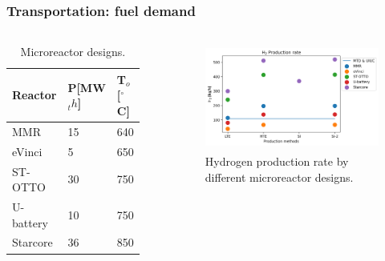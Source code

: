\begin{frame}
\frametitle{Transportation: fuel demand}
\begin{columns}
    \column[t]{4.5cm}
	\begin{table}[!htb]
		\centering
	    \caption{Microreactor designs.}
		\begin{tabular}{l|ll}
		\hline
		Reactor      & P[MW$_th$] & T$_o$[$^\circ$C]\\ \hline
		MMR          & 15         & 640             \\
		eVinci       & 5          & 650             \\
		ST-OTTO      & 30         & 750             \\
		U-battery    & 10         & 750             \\
		Starcore     & 36         & 850             \\ \hline
        \end{tabular}
	    \label{tab:h2req1}
	\end{table}

	\column[t]{5.5cm}
	\begin{figure}[htbp!]
		\begin{center}
			\includegraphics[height=3.5cm]{images/reactors-by-hour}
		\end{center}
		\caption{Hydrogen production rate by different microreactor designs.}
	\end{figure}

\end{columns}
\end{frame}


